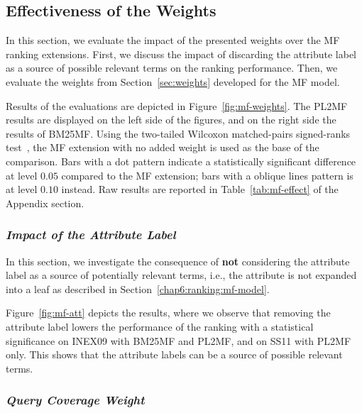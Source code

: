 

\subsection{Effectiveness of the Weights}
\label{sec:weights-effectiveness}

In this section, we evaluate the impact of the presented weights over the \gls{MF} ranking extensions. First, we discuss the impact of discarding the attribute label as a source of possible relevant terms on the ranking performance. Then, we evaluate the weights from Section~\ref{sec:weights} developed for the \gls{MF} model.

Results of the evaluations are depicted in Figure~\ref{fig:mf-weights}. The \gls{PL2MF} results are displayed on the left side of the figures, and on the right side the results of \gls{BM25MF}. Using the two-tailed Wilcoxon matched-pairs signed-ranks test~\cite{sheskin:2003:CRC,buttcher:2010:IRI:1869919}, the \gls{MF} extension with no added weight is used as the base of the comparison. Bars with a dot pattern indicate a statistically significant difference at level $0.05$ compared to the \gls{MF} extension; bars with a oblique lines pattern is at level $0.10$ instead. Raw results are reported in Table~\ref{tab:mf-effect} of the Appendix section.

\subsubsection{\emph{Impact of the Attribute Label}}
\label{sec:with-att}

In this section, we investigate the consequence of \textbf{not} considering the attribute label as a source of potentially relevant terms, i.e., the attribute is not expanded into a leaf as described in Section~\ref{chap6:ranking:mf-model}.

Figure~\ref{fig:mf-att} depicts the results, where we observe that removing the attribute label lowers the performance of the ranking with a statistical significance on INEX09 with \gls{BM25MF} and \gls{PL2MF}, and on SS11 with \gls{PL2MF} only. This shows that the attribute labels can be a source of possible relevant terms.

\subsubsection{\emph{Query Coverage Weight}}
\label{sec:qc-weight-effect}

